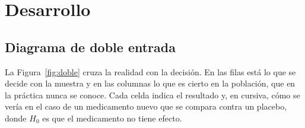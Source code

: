 \documentclass[11pt,letterpaper]{article}
\begin{document}
\section{Desarrollo}

\subsection{Diagrama de doble entrada}

La Figura~\ref{fig:doble} cruza la realidad con la decisión. En las filas está lo que se decide con la muestra y en las columnas lo que es cierto en la población, que en la práctica nunca se conoce. Cada celda indica el resultado y, en cursiva, cómo se vería en el caso de un medicamento nuevo que se compara contra un placebo, donde $H_0$ es que el medicamento no tiene efecto.
\end{document}
